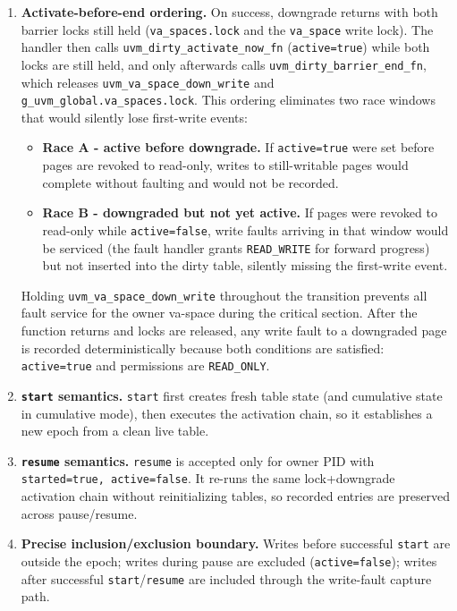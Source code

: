 \begin{enumerate}
    \item \textbf{Activate-before-end ordering.}
          On success, downgrade returns with both barrier locks still held
          (\texttt{va\_spaces.lock} and the \texttt{va\_space} write lock).
          The handler then calls \texttt{uvm\_dirty\_activate\_now\_fn}
          (\texttt{active=true}) while both locks are still held, and only
          afterwards calls \texttt{uvm\_dirty\_barrier\_end\_fn}, which
          releases \texttt{uvm\_va\_space\_down\_write} and
          \texttt{g\_uvm\_global.va\_spaces.lock}.
          This ordering eliminates two race windows that would silently lose
          first-write events:
          \begin{itemize}
              \item \textbf{Race A - active before downgrade.}  If
                    \texttt{active=true} were set before pages are revoked to
                    read-only, writes to still-writable pages would complete
                    without faulting and would not be recorded.
              \item \textbf{Race B - downgraded but not yet active.}  If
                    pages were revoked to read-only while \texttt{active=false},
                    write faults arriving in that window would be serviced
                    (the fault handler grants \texttt{READ\_WRITE} for forward
                    progress) but not inserted into the dirty table, silently
                    missing the first-write event.
          \end{itemize}
          Holding \texttt{uvm\_va\_space\_down\_write} throughout the
          transition prevents all fault service for the owner va-space during
          the critical section. After the function returns and locks are
          released, any write fault to a downgraded page is recorded
          deterministically because both conditions are satisfied:
          \texttt{active=true} and permissions are \texttt{READ\_ONLY}.

    \item \textbf{\texttt{start} semantics.}
          \texttt{start} first creates fresh table state (and cumulative state
          in cumulative mode), then executes the activation chain, so it
          establishes a new epoch from a clean live table.

    \item \textbf{\texttt{resume} semantics.}
          \texttt{resume} is accepted only for owner PID with
          \texttt{started=true, active=false}. It re-runs the same lock+downgrade
          activation chain without reinitializing tables, so recorded entries
          are preserved across pause/resume.

    \item \textbf{Precise inclusion/exclusion boundary.}
          Writes before successful \texttt{start} are outside the epoch;
          writes during pause are excluded (\texttt{active=false}); writes after
          successful \texttt{start}/\texttt{resume} are included through the
          write-fault capture path.
\end{enumerate}

